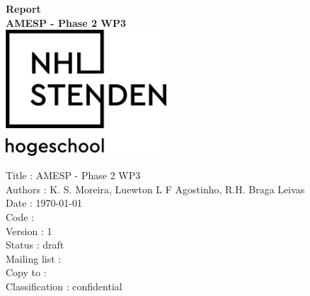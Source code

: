 \documentclass[oneside,12pt]{article}
\begin{document}
\setlength{\parindent}{0 em}    %
\setlength{\parskip}{0.7 em}    %
\renewcommand{\baselinestretch}{1.5}    %

\newcommand{\ProjectTitle}{AMESP - Phase 2 WP3} %

\begin{titlepage}
    \begin{center}
    \vspace*{3 cm}
    \Huge
    \textbf{Report} \\
    \vspace{1 cm}    
    \textbf{\ProjectTitle}
    \\
    \vspace{1 cm}
    \vfill      %
    \includegraphics[width=60mm]{figures/NHLStenden-logo.png} \\
    \end{center}
    \vspace{2 cm}
    \normalsize
    Title : \ProjectTitle
    \\
    Authors : K. S. Moreira, Luewton L F Agostinho, R.H. Braga Leivas
    \\
    Date : \today 
    \\
    Code : 
    \\
    Version : 1 \\
    Status : draft \\
    Mailing list : 
    \\
    Copy to : \\
    Classification : confidential
\end{titlepage}

\end{document}
